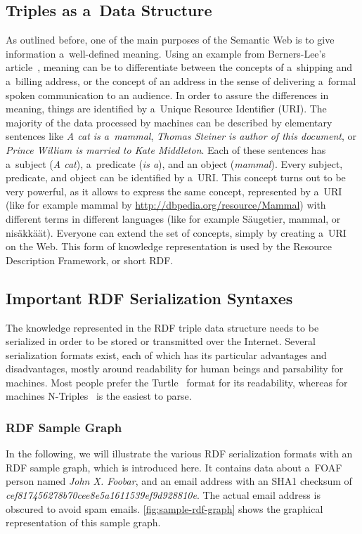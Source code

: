 \subsection{Triples as a~Data Structure}
As outlined before, one of the main purposes of the Semantic Web is to give information
a~well-defined meaning.
Using an example from Berners-Lee’s article~\cite{BernersLee2001},
meaning can be to differentiate between the concepts of a~shipping and a~billing address,
or the concept of an address in the sense of delivering a~formal spoken communication to an audience.
In order to assure the differences in meaning,
things are identified by a~Unique Resource Identifier (URI).
The majority of the data processed by machines can be described by elementary sentences like
\emph{A cat is a~mammal}, \emph{Thomas Steiner is author of this document}, or
\emph{Prince William is married to Kate Middleton}.
Each of these sentences has a~subject (\emph{A cat}), a~predicate (\emph{is a}),
and an object (\emph{mammal}).
Every subject, predicate, and object can be identified by a~URI.
This concept turns out to be very powerful, as it allows to express the same concept,
represented by a~URI (like for example mammal by \url{http://dbpedia.org/resource/Mammal})
with different terms in different languages (like for example Säugetier, mammal, or nisäkkäät). 
Everyone can extend the set of concepts, simply by creating a~URI on the Web.
This form of knowledge representation is used by the Resource Description Framework, or short RDF.

\subsection{Important RDF Serialization Syntaxes}
The knowledge represented in the RDF triple data structure needs to be serialized
in order to be stored or transmitted over the Internet.
Several serialization formats exist, each of which has its particular advantages
and disadvantages, mostly around readability for human beings and parsability for machines.
Most people prefer the Turtle~\cite{Prudhommeaux2011} format for its readability,
whereas for machines N-Triples~\cite{Grant2004} is the easiest to parse.

\subsubsection{RDF Sample Graph}
In the following, we will illustrate the various RDF serialization formats
with an RDF sample graph, which is introduced here.
It contains data about a~FOAF~\cite{Brickley2010} person named \emph{John X. Foobar},
and an email address with an SHA1 checksum of \emph{cef817456278b70cee8e5a1611539\-ef9d928810e}.
The actual email address is obscured to avoid spam emails.
\autoref{fig:sample-rdf-graph} shows the graphical representation of this sample graph.

